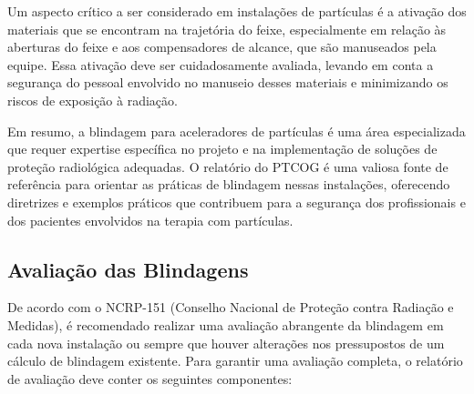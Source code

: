 \documentclass[11pt,a4paper]{article}
\newcounter{exemplo}
\begin{document}
	Um aspecto crítico a ser considerado em instalações de partículas é a ativação dos materiais que se encontram na trajetória do feixe, especialmente em relação às aberturas do feixe e aos compensadores de alcance, que são manuseados pela equipe. Essa ativação deve ser cuidadosamente avaliada, levando em conta a segurança do pessoal envolvido no manuseio desses materiais e minimizando os riscos de exposição à radiação.

	Em resumo, a blindagem para aceleradores de partículas é uma área especializada que requer expertise específica no projeto e na implementação de soluções de proteção radiológica adequadas. O relatório do PTCOG é uma valiosa fonte de referência para orientar as práticas de blindagem nessas instalações, oferecendo diretrizes e exemplos práticos que contribuem para a segurança dos profissionais e dos pacientes envolvidos na terapia com partículas.

\subsection*{Avaliação das Blindagens}

	De acordo com o NCRP-151 (Conselho Nacional de Proteção contra Radiação e Medidas), é recomendado realizar uma avaliação abrangente da blindagem em cada nova instalação ou sempre que houver alterações nos pressupostos de um cálculo de blindagem existente. Para garantir uma avaliação completa, o relatório de avaliação deve conter os seguintes componentes:
\end{document}
